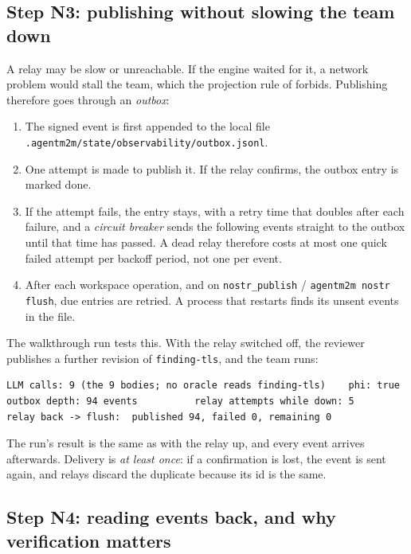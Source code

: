 \documentclass[10pt,a4paper]{article}
\newcommand{\code}[1]{\texttt{#1}}
\newcommand{\file}[1]{\texttt{#1}}
\theoremstyle{definition}
\begin{document}
\subsection{Step N3: publishing without slowing the team down}\label{sec:outbox}

A relay may be slow or unreachable. If the engine waited for it, a network
problem would stall the team, which the projection rule of 
forbids. Publishing therefore goes through an \emph{outbox}:

\begin{enumerate}[nosep]
\item The signed event is first appended to the local file
\file{.agentm2m/state/observability/outbox.jsonl}.
\item One attempt is made to publish it. If the relay confirms, the outbox
entry is marked done.
\item If the attempt fails, the entry stays, with a retry time that doubles
after each failure, and a \emph{circuit breaker} sends the following events
straight to the outbox until that time has passed. A dead relay therefore
costs at most one quick failed attempt per backoff period, not one per event.
\item After each workspace operation, and on \code{nostr\_publish} /
\code{agentm2m nostr flush}, due entries are retried. A process that restarts
finds its unsent events in the file.
\end{enumerate}

\noindent The walkthrough run tests this. With the relay switched off, the
reviewer publishes a further revision of \code{finding-tls}, and the team
runs:

\begin{lstlisting}[style=engine, caption={Relay outage during a run.}]
LLM calls: 9 (the 9 bodies; no oracle reads finding-tls)    phi: true
outbox depth: 94 events          relay attempts while down: 5
relay back -> flush:  published 94, failed 0, remaining 0
\end{lstlisting}

\noindent The run's result is the same as with the relay up, and every event
arrives afterwards. Delivery is \emph{at least once}: if a confirmation is
lost, the event is sent again, and relays discard the duplicate because its
id is the same.

\subsection{Step N4: reading events back, and why verification matters}
\end{document}
